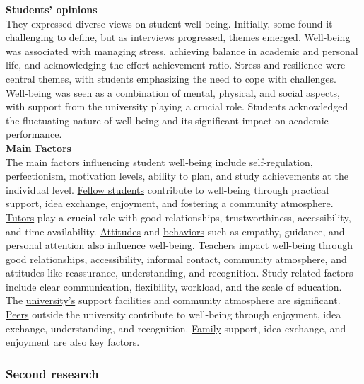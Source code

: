 \documentclass[11pt]{report}
\begin{document}
\textbf{Students' opinions} \\
They expressed diverse views on student well-being. Initially, some found it challenging to define, but as interviews progressed, themes emerged. Well-being was associated with managing stress, achieving balance in academic and personal life, and acknowledging the effort-achievement ratio. Stress and resilience were central themes, with students emphasizing the need to cope with challenges. Well-being was seen as a combination of mental, physical, and social aspects, with support from the university playing a crucial role. Students acknowledged the fluctuating nature of well-being and its significant impact on academic performance.\vspace{5mm} \\
\textbf{Main Factors} \\
The main factors influencing student well-being include self-regulation, perfectionism, motivation levels, ability to plan, and study achievements at the individual level. \underline{Fellow students} contribute to well-being through practical support, idea exchange, enjoyment, and fostering a community atmosphere. \underline{Tutors} play a crucial role with good relationships, trustworthiness, accessibility, and time availability. \underline{Attitudes} and \underline{behaviors} such as empathy, guidance, and personal attention also influence well-being. \underline{Teachers} impact well-being through good relationships, accessibility, informal contact, community atmosphere, and attitudes like reassurance, understanding, and recognition. Study-related factors include clear communication, flexibility, workload, and the scale of education. The \underline{university's} support facilities and community atmosphere are significant. \underline{Peers} outside the university contribute to well-being through enjoyment, idea exchange, understanding, and recognition. \underline{Family} support, idea exchange, and enjoyment are also key factors.

\subsubsection{Second research}
\end{document}
